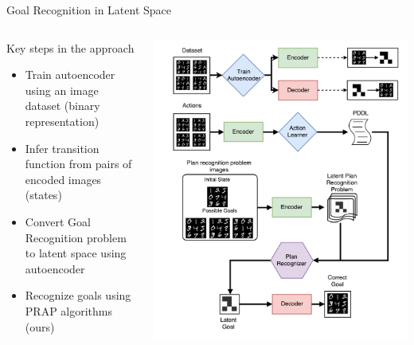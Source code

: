 \documentclass[usenames,dvipsnames]{beamer}
\begin{document}
\begin{frame}[c]{Goal Recognition in Latent Space}
	\begin{columns}
		\begin{column}{.35\textwidth}
			Key steps in the approach
			\small
			\begin{itemize}
				\item Train autoencoder using an image dataset (binary representation)
				\item Infer transition function from pairs of encoded images (states)
				\item Convert Goal Recognition problem to latent space using autoencoder
				\item Recognize goals using PRAP algorithms (ours)
			\end{itemize}
		\end{column}
		\begin{column}{.6\textwidth}
			\begin{center}
				\includegraphics[width=.85\textwidth]{fig/IGR_Full.pdf}
			\end{center}
		\end{column}
	\end{columns}
\end{frame}
\end{document}
